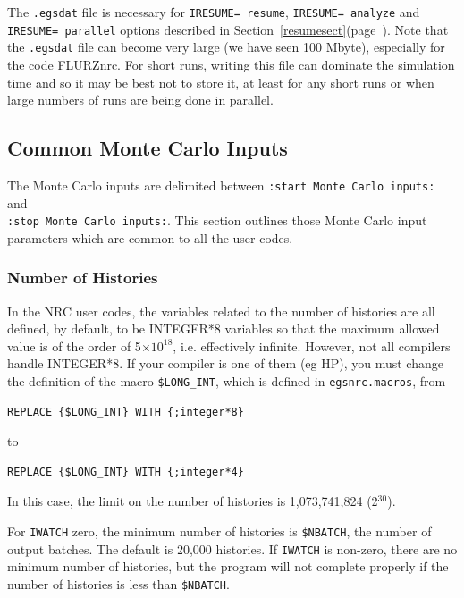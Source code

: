 \documentclass[12pt,twoside]{article}  %
\newcommand{\lpage}[1]{(page~\pageref{#1})}
\begin{document}
The {\tt .egsdat} file is necessary for {\tt IRESUME= resume},
{\tt IRESUME= analyze} and {\tt IRESUME= parallel} options described in
Section~\ref{resumesect}\lpage{resumesect}.  Note that the {\tt .egsdat}
file can become very large (we have seen 100 Mbyte), especially for
the code FLURZnrc.  For short runs, writing this file can dominate the
simulation time and so it may be best not to store it, at least for any
short runs or when large numbers of runs are being done in parallel.

\subsection{Common Monte Carlo Inputs}
\label{MC_inputs}

The Monte Carlo inputs are delimited between
\verb+:start Monte Carlo inputs:+ and \\
\verb+:stop Monte Carlo inputs:+. This section outlines those
Monte Carlo input parameters which are common to all the user codes.

\subsubsection{Number of Histories}
\label{histsect}

In the NRC user codes, the variables related to the number of histories
are all defined, by default, to be INTEGER*8 variables so that the
maximum allowed value is of the order of 5$\times 10^{18}$, i.e.
effectively infinite.  However, not all compilers handle INTEGER*8. If
your compiler is one of them (eg HP), you must change the definition of
the macro {\tt \$LONG\_INT}, which is defined in {\tt egsnrc.macros}, from
\begin{verbatim}
REPLACE {$LONG_INT} WITH {;integer*8}
\end{verbatim}
to
\begin{verbatim}
REPLACE {$LONG_INT} WITH {;integer*4}
\end{verbatim}
In this case, the limit on the number of histories is 1,073,741,824
(2$^{30}$).

For {\tt IWATCH} zero, the minimum number of histories is {\tt \$NBATCH},
the number of output batches.
The default is 20,000 histories.
If {\tt IWATCH} is non-zero, there are no minimum number of histories,
but the program will not complete properly if the number of histories
is less than {\tt \$NBATCH}.
\end{document}

